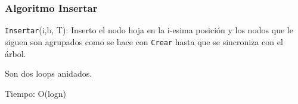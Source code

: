 \documentclass[10pt]{beamer}
\begin{document}
\begin{frame}
  \pause

\end{frame}


\begin{frame}
\frametitle{Algoritmo Insertar}
  \texttt{Insertar}(i,b, T): Inserto el nodo hoja en la i-esima posición y los nodos que le siguen son agrupados
  como se hace con  \texttt{Crear} hasta que se sincroniza con el árbol.

  Son dos loops anidados.

  Tiempo: O(logn)
\end{frame}



\end{document}
